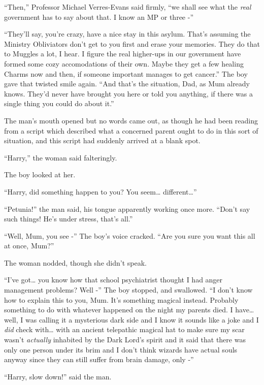 ``Then,'' Professor Michael Verres-Evans said firmly, ``we shall see
what the \emph{real} government has to say about that. I know an MP or
three -''

``They'll say, you're crazy, have a nice stay in this asylum. That's
assuming the Ministry Obliviators don't get to you first and erase your
memories. They do that to Muggles a lot, I hear. I figure the real
higher-ups in our government have formed some cozy accomodations of
their own. Maybe they get a few healing Charms now and then, if someone
important manages to get cancer.'' The boy gave that twisted smile
again. ``And that's the situation, Dad, as Mum already knows. They'd
never have brought you here or told you anything, if there was a single
thing you could do about it.''

The man's mouth opened but no words came out, as though he had been
reading from a script which described what a concerned parent ought to
do in this sort of situation, and this script had suddenly arrived at a
blank spot.

``Harry,'' the woman said falteringly.

The boy looked at her.

``Harry, did something happen to you? You seem\ldots{}
different\ldots{}''

``Petunia!'' the man said, his tongue apparently working once more.
``Don't say such things! He's under stress, that's all.''

``Well, Mum, you see -'' The boy's voice cracked. ``Are you sure you
want this all at once, Mum?''

The woman nodded, though she didn't speak.

``I've got\ldots{} you know how that school psychiatrist thought I had
anger management problems? Well -'' The boy stopped, and swallowed. ``I
don't know how to explain this to you, Mum. It's something magical
instead. Probably something to do with whatever happened on the night my
parents died. I have\ldots{} well, I was calling it a mysterious dark
side and I know it sounds like a joke and I \emph{did} check
with\ldots{} with an ancient telepathic magical hat to make sure my scar
wasn't \emph{actually} inhabited by the Dark Lord's spirit and it said
that there was only one person under its brim and I don't think wizards
have actual souls anyway since they can still suffer from brain damage,
only -''

``Harry, slow down!'' said the man.

